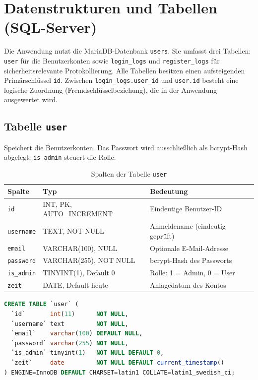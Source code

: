 \chapter{Datenstrukturen und Tabellen (SQL-Server)}
\label{ch:a-datenbank}

Die Anwendung nutzt die MariaDB-Datenbank \texttt{users}. Sie umfasst drei Tabellen: \texttt{user}
f\"ur die Benutzerkonten sowie \texttt{login\_logs} und \texttt{register\_logs} f\"ur
sicherheitsrelevante Protokollierung. Alle Tabellen besitzen einen aufsteigenden
Prim\"arschl\"ussel \texttt{id}. Zwischen \texttt{login\_logs.user\_id} und \texttt{user.id}
besteht eine logische Zuordnung (Fremdschl\"usselbeziehung), die in der Anwendung ausgewertet wird.

\section{Tabelle \texttt{user}}
Speichert die Benutzerkonten. Das Passwort wird ausschlie\ss{}lich als bcrypt-Hash abgelegt;
\texttt{is\_admin} steuert die Rolle.

\begin{table}[htbp]
\centering
\caption{Spalten der Tabelle \texttt{user}}
\label{tab:db-user}
\begin{tabularx}{\textwidth}{@{}l l X@{}}
\toprule
\textbf{Spalte} & \textbf{Typ} & \textbf{Bedeutung} \\
\midrule
\texttt{id}       & INT, PK, AUTO\_INCREMENT & Eindeutige Benutzer-ID \\
\texttt{username} & TEXT, NOT NULL           & Anmeldename (eindeutig gepr\"uft) \\
\texttt{email}    & VARCHAR(100), NULL       & Optionale E-Mail-Adresse \\
\texttt{password} & VARCHAR(255), NOT NULL   & bcrypt-Hash des Passworts \\
\texttt{is\_admin}& TINYINT(1), Default 0    & Rolle: 1 = Admin, 0 = User \\
\texttt{zeit}     & DATE, Default heute      & Anlagedatum des Kontos \\
\bottomrule
\end{tabularx}
\end{table}

\begin{lstlisting}[language=SQL,caption={CREATE-Statement der Tabelle \texttt{user}},label={lst:db-user}]
CREATE TABLE `user` (
  `id`       int(11)      NOT NULL,
  `username` text         NOT NULL,
  `email`    varchar(100) DEFAULT NULL,
  `password` varchar(255) NOT NULL,
  `is_admin` tinyint(1)   NOT NULL DEFAULT 0,
  `zeit`     date         NOT NULL DEFAULT current_timestamp()
) ENGINE=InnoDB DEFAULT CHARSET=latin1 COLLATE=latin1_swedish_ci;
\end{lstlisting}

